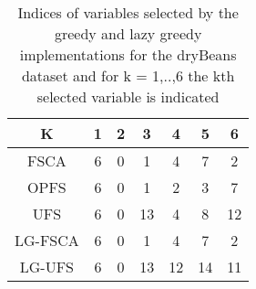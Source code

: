 \begin{table}
	\begin{center}
		\begin{tabular}{c c c c c c c}
			K & 1 & 2 & 3 & 4 & 5 & 6 \\
			\hline
			FSCA & 6 & 0 & 1 & 4 & 7 & 2 \\
			OPFS & 6 & 0 & 1 & 2 & 3 & 7 \\
			UFS & 6 & 0 & 13 & 4 & 8 & 12 \\
			LG-FSCA & 6 & 0 & 1 & 4 & 7 & 2 \\
			LG-UFS & 6 & 0 & 13 & 12 & 14 & 11 \\
		\end{tabular}
	\end{center}
	\caption{Indices of variables selected by the greedy and lazy greedy implementations for the dryBeans dataset and for k = 1,..,6 the kth selected variable is indicated}
\end{table}